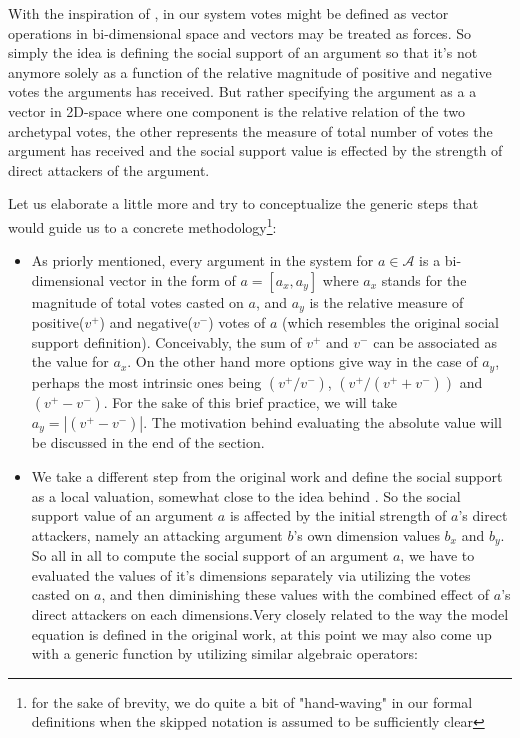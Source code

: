 \documentclass{article}
\begin{document}
 {\color{red}
With the inspiration of \cite{baroniTAB13}, in our system votes might be defined as vector operations in bi-dimensional space and vectors may be treated as forces. So simply the idea is defining the social support of an argument so that it's not anymore solely as a function of the relative magnitude of positive and negative votes the arguments has received. But rather specifying the argument as a a vector in 2D-space where one component is the relative relation of the two archetypal votes, the other represents the measure of total number of votes the argument has received and the social support value is effected by the strength of direct attackers of the argument.


Let us elaborate a little more and try to conceptualize the generic steps that would guide us to a concrete methodology\footnote{for the sake of brevity, we do quite a bit of "hand-waving" in our formal definitions when the skipped notation is assumed to be sufficiently clear}:

\begin{itemize}
\item As priorly mentioned, every argument in the system for $ a \in \mathcal{A}$ is a bi-dimensional vector in the form of $ a = [a_{x}, a_{y}]$ where $a_{x}$ stands for the magnitude of total votes casted on $a$, and $a_{y}$ is the relative measure of positive($v^{+}$) and negative($v^{-}$) votes of $a$ (which resembles the original social support definition). 
Conceivably, the sum of $v^{+}$ and $v^{-}$ can be associated as the value for $a_{x}$. On the other hand more options give way in the case of $a_{y}$, perhaps the most intrinsic ones being   $(v^{+} / v^{-})$,  $(v^{+} / (v^{+}+v^{-}))$ and $(v^{+} - v^{-})$. For the sake of this brief practice, we will take $a_{y} = |(v^{+} - v^{-})|$. The motivation behind evaluating the absolute value will be discussed in the end of the section.
\item We take a different step from the original work and define the social support as a local valuation, somewhat close to the idea behind \cite{gradinarg}. So the social support value of an argument $a$ is affected by the initial strength of $a$'s direct attackers, namely an attacking argument $b$'s own dimension values $b_{x}$ and $ b_{y}$. So all in all to compute the social support of an argument $a$, we have to evaluated the values of it's dimensions separately via utilizing the votes casted on $a$, and then diminishing these values with the combined effect of $a$'s direct attackers on each dimensions.Very closely related to the way the model equation is defined in the original work, at this point we may also come up with a generic function by utilizing similar algebraic operators:


\end{itemize}}
\end{document}

